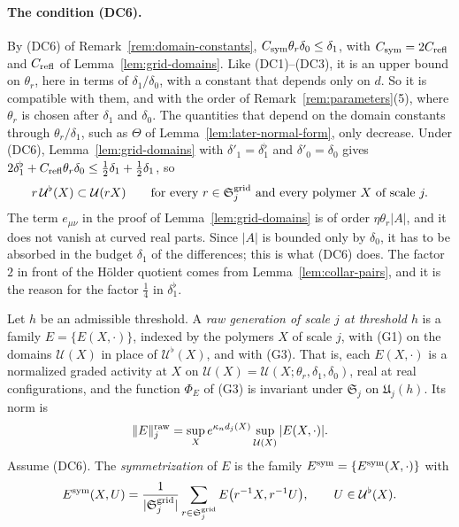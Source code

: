 \paragraph{The condition (DC6).} By (DC6) of Remark~\ref{rem:domain-constants}, $C_{\rm sym}\theta_r\delta_0\le\delta_1$, with $C_{\rm sym}=2C_{\rm refl}$ and $C_{\rm refl}$ of Lemma~\ref{lem:grid-domains}. Like (DC1)--(DC3), it is an upper bound on $\theta_r$, here in terms of $\delta_1/\delta_0$, with a constant that depends only on $d$. So it is compatible with them, and with the order of Remark~\ref{rem:parameters}(5), where $\theta_r$ is chosen after $\delta_1$ and $\delta_0$. The quantities that depend on the domain constants through $\theta_r/\delta_1$, such as $\Theta$ of Lemma~\ref{lem:later-normal-form}, only decrease. Under (DC6), Lemma~\ref{lem:grid-domains} with $\delta'_1=\delta_1^\flat$ and $\delta'_0=\delta_0$ gives $2\delta_1^\flat+C_{\rm refl}\theta_r\delta_0\le\frac12\delta_1+\frac12\delta_1$, so
\begin{equation}\label{eq:flat-in-full}
r\,\mathcal U^\flat(X)\subset\mathcal U(rX)\qquad\text{for every }r\in\mathfrak S^{\rm grid}_j\text{ and every polymer }X\text{ of scale }j.
\end{equation}
The term $e_{\mu\nu}$ in the proof of Lemma~\ref{lem:grid-domains} is of order $\eta\theta_r|A|$, and it does not vanish at curved real parts. Since $|A|$ is bounded only by $\delta_0$, it has to be absorbed in the budget $\delta_1$ of the differences; this is what (DC6) does. The factor $2$ in front of the H\"older quotient comes from Lemma~\ref{lem:collar-pairs}, and it is the reason for the factor $\frac14$ in $\delta_1^\flat$.

\begin{definition}\label{def:symmetrization}
Let $h$ be an admissible threshold. A \emph{raw generation of scale $j$ at threshold $h$} is a family $E=\{E(X,\cdot)\}$, indexed by the polymers $X$ of scale $j$, with (G1) on the domains $\mathcal U(X)$ in place of $\mathcal U^\flat(X)$, and with (G3). That is, each $E(X,\cdot)$ is a normalized graded activity at $X$ on $\mathcal U(X)=\mathcal U(X;\theta_r,\delta_1,\delta_0)$, real at real configurations, and the function $\Phi_E$ of (G3) is invariant under $\mathfrak S_j$ on $\mathfrak U_j(h)$. Its norm is
\[
\|E\|^{\rm raw}_j=\sup_Xe^{\kappa_nd_j(X)}\sup_{\mathcal U(X)}|E(X,\cdot)| .
\]
Assume (DC6). The \emph{symmetrization} of $E$ is the family $E^{\rm sym}=\{E^{\rm sym}(X,\cdot)\}$ with
\[
E^{\rm sym}(X,U)=\frac1{|\mathfrak S^{\rm grid}_j|}\sum_{r\in\mathfrak S^{\rm grid}_j}E\big(r^{-1}X,r^{-1}U\big),\qquad U\in\mathcal U^\flat(X).
\]
\end{definition}

